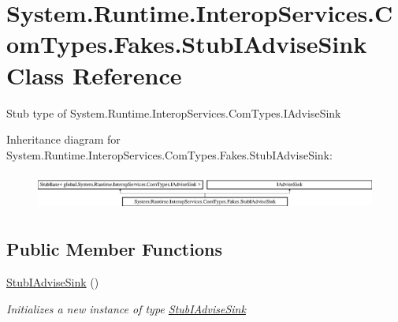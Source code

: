 \hypertarget{class_system_1_1_runtime_1_1_interop_services_1_1_com_types_1_1_fakes_1_1_stub_i_advise_sink}{\section{System.\-Runtime.\-Interop\-Services.\-Com\-Types.\-Fakes.\-Stub\-I\-Advise\-Sink Class Reference}
\label{class_system_1_1_runtime_1_1_interop_services_1_1_com_types_1_1_fakes_1_1_stub_i_advise_sink}
}


Stub type of System.\-Runtime.\-Interop\-Services.\-Com\-Types.\-I\-Advise\-Sink 


Inheritance diagram for System.\-Runtime.\-Interop\-Services.\-Com\-Types.\-Fakes.\-Stub\-I\-Advise\-Sink\-:\begin{figure}[H]
\begin{center}
\leavevmode
\includegraphics[height=1.247216cm]{class_system_1_1_runtime_1_1_interop_services_1_1_com_types_1_1_fakes_1_1_stub_i_advise_sink}
\end{center}
\end{figure}
\subsection*{Public Member Functions}
\begin{DoxyCompactItemize}
\item 
\hyperlink{class_system_1_1_runtime_1_1_interop_services_1_1_com_types_1_1_fakes_1_1_stub_i_advise_sink_a54b91ae0512fb939813755e3221622f1}{Stub\-I\-Advise\-Sink} ()
\begin{DoxyCompactList}\small\item\em Initializes a new instance of type \hyperlink{class_system_1_1_runtime_1_1_interop_services_1_1_com_types_1_1_fakes_1_1_stub_i_advise_sink}{Stub\-I\-Advise\-Sink}\end{DoxyCompactList}\end{DoxyCompactItemize}
